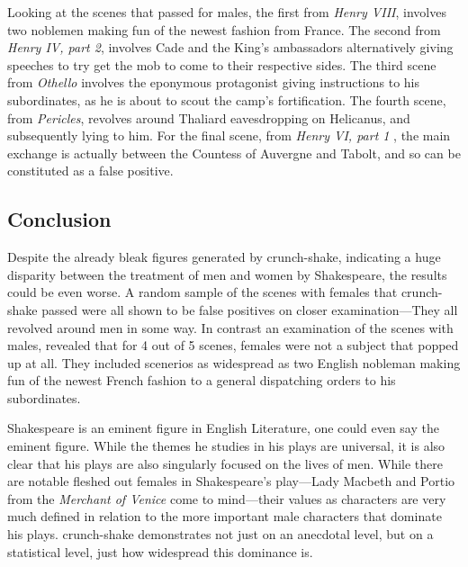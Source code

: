 \documentclass[12pt]{article}
\begin{document}
Looking at the scenes that passed for males, the first from \emph{Henry VIII},
involves two noblemen making fun of the newest fashion from France. The second
from \emph{Henry IV, part 2}, involves Cade and the King's ambassadors
alternatively giving speeches to try get the mob to come to their respective
sides. The third scene from \emph{Othello} involves the eponymous protagonist
giving instructions to his subordinates, as he is about to scout the camp's
fortification. The fourth scene, from \emph{Pericles}, revolves around Thaliard
eavesdropping on Helicanus, and subsequently lying to him. For the final scene,
from \emph{Henry VI, part 1} , the main exchange is actually between the
Countess of Auvergne and Tabolt, and so can be constituted as a false positive.

\subsection{Conclusion} 
\label{sub:conclusion}

Despite the already bleak figures generated by crunch-shake, indicating a huge
disparity between the treatment of men and women by Shakespeare, the results
could be even worse. A random sample of the scenes with females that
crunch-shake passed were all shown to be false positives on closer
examination---They all revolved around men in some way. In contrast an
examination of the scenes with males, revealed that for 4 out of 5 scenes,
females were not a subject that popped up at all. They included scenerios as
widespread as two English nobleman making fun of the newest French fashion to a general
dispatching orders to his subordinates. 

Shakespeare is an eminent figure in English Literature, one could even say the
eminent figure. While the themes he studies in his plays are universal, it is
also clear that his plays are also singularly focused on the lives of men.
While there are notable fleshed out females in Shakespeare's play---Lady
Macbeth and Portio from the \emph{Merchant of Venice} come to mind---their
values as characters are very much defined in relation to the more important
male characters that dominate his plays. crunch-shake demonstrates not just on
an anecdotal level, but on a statistical level, just how widespread this
dominance is.

 
 
\end{document}
